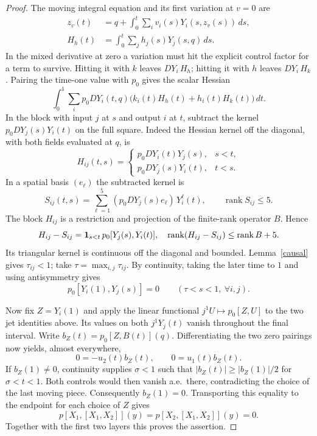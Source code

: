 \documentclass[11pt,letterpaper]{article}
\newcommand{\rank}{\operatorname{rank}}
\begin{document}
\begin{proof}
The moving integral equation and its first variation at $v=0$ are
\[
 \begin{aligned}
 z_v(t)&=q+\int_0^t\sum_i v_i(s)Y_i(s,z_v(s))\,ds,\\
 H_h(t)&=\int_0^t\sum_j h_j(s)Y_j(s,q)\,ds .
 \end{aligned}
\]
In the mixed derivative at zero a variation must hit the explicit control
factor for a term to survive. Hitting it with $k$ leaves $D Y_i\,H_h$;
hitting it with $h$ leaves $D Y_i\,H_k$. Pairing the time-one value with
$p_0$ gives the scalar Hessian
\[
 \int_0^1\sum_i p_0DY_i(t,q)
 \big(k_i(t)H_h(t)+h_i(t)H_k(t)\big)\,dt .
\]
In the block with input $j$ at $s$ and output $i$ at $t$, subtract the
kernel $p_0DY_j(s)Y_i(t)$ on the full square. Indeed the Hessian kernel off
the diagonal, with both fields evaluated at $q$, is
\begin{equation}\label{kernel}
 H_{ij}(t,s)=
 \begin{cases}
 p_0DY_i(t)Y_j(s), & s<t,\\
 p_0DY_j(s)Y_i(t), & t<s .
 \end{cases}
\end{equation}
In a spatial basis $(e_\ell)$ the subtracted kernel is
\[
 S_{ij}(t,s)=\sum_{\ell=1}^5
       (p_0DY_j(s)e_\ell)\,Y_i^\ell(t),\qquad \rank S_{ij}\le5 .
\]
The block $H_{ij}$ is a restriction and projection of the finite-rank
operator $B$. Hence
\[
 H_{ij}-S_{ij}={\bf1}_{s<t}\,p_0[Y_j(s),Y_i(t)],\quad
 \rank(H_{ij}-S_{ij})\le\rank B+5 .
\]
Its triangular kernel is continuous off the diagonal and bounded.
Lemma~\ref{causal} gives $\tau_{ij}<1$; take $\tau=\max_{i,j}\tau_{ij}$.
By continuity, taking the later time to $1$ and using antisymmetry gives
\[
 p_0[Y_i(1),Y_j(s)]=0\qquad(\tau<s<1,\ \forall i,j).
\]

Now fix $Z=Y_i(1)$ and apply the linear functional $j^1U\mapsto p_0[Z,U]$
to the two jet identities above. Its values on both $j^1Y_j(t)$ vanish
throughout the final interval. Write $b_Z(t)=p_0[Z,B(t)](q)$.
Differentiating the two zero pairings now yields, almost everywhere,
\[
 0=-u_2(t)b_Z(t),\qquad 0=u_1(t)b_Z(t).
\]
If $b_Z(1)\ne0$, continuity supplies $\sigma<1$ such that
$|b_Z(t)|\ge |b_Z(1)|/2$ for $\sigma<t<1$. Both controls would then
vanish a.e.\ there, contradicting the choice of the last moving piece.
Consequently $b_Z(1)=0$. Transporting this equality to the endpoint for
each choice of $Z$ gives
\[
 p[X_1,[X_1,X_2]](y)=p[X_2,[X_1,X_2]](y)=0 .
\]
Together with the first two layers this proves the assertion.
\end{proof}
\end{document}
